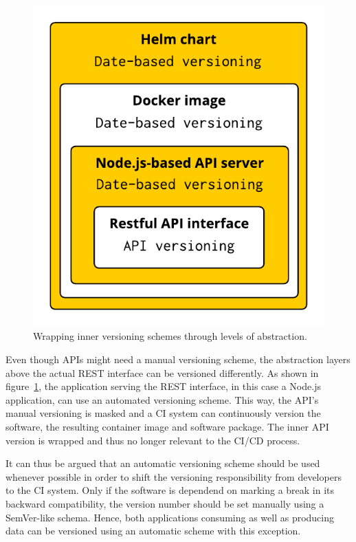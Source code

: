 \begin{figure}[H]
\begin{center}
  \includegraphics[scale=0.7]{images/figures/version_wrapping.pdf}
\end{center}
\caption{Wrapping inner versioning schemes through levels of abstraction.}%
\label{fig:version_wrapping}
\end{figure}

Even though \acp{API} might need a manual versioning scheme, the abstraction
layers above the actual \ac{REST} interface can be versioned differently. As
shown in figure~\ref{fig:version_wrapping}, the application serving the
\ac{REST} interface, in this case a Node.js application, can use an automated
versioning scheme. This way, the \ac{API}'s manual versioning is masked and a
\ac{CI} system can continuously version the software, the resulting container
image and software package. The inner \ac{API} version is wrapped and thus no
longer relevant to the \ac{CI}/\ac{CD} process.

It can thus be argued that an automatic versioning scheme should be used
whenever possible in order to shift the versioning responsibility from
developers to the \ac{CI} system. Only if the software is dependend on marking
a break in its backward compatibility, the version number should be set
manually using a SemVer-like schema. Hence, both applications consuming as well
as producing data can be versioned using an automatic scheme with this
exception.

